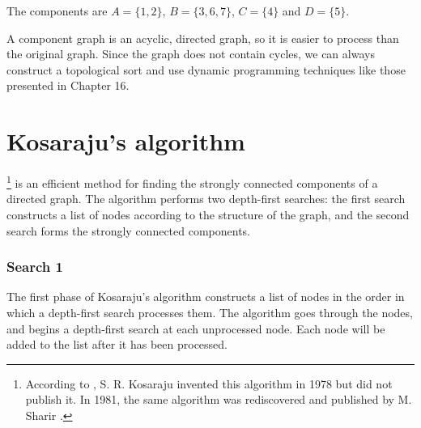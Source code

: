 \begin{center}
\end{center}
The components are $A=\{1,2\}$,
$B=\{3,6,7\}$, $C=\{4\}$ and $D=\{5\}$.

A component graph is an acyclic, directed graph,
so it is easier to process than the original graph.
Since the graph does not contain cycles,
we can always construct a topological sort and
use dynamic programming techniques like those
presented in Chapter 16.

\section{Kosaraju's algorithm}



\footnote{According to \cite{aho83},
    S. R. Kosaraju invented this algorithm in 1978
    but did not publish it. In 1981, the same algorithm was rediscovered
    and published by M. Sharir \cite{sha81}.} is an efficient
method for finding the strongly connected components
of a directed graph.
The algorithm performs two depth-first searches:
the first search constructs a list of nodes
according to the structure of the graph,
and the second search forms the strongly connected components.

\subsubsection{Search 1}

The first phase of Kosaraju's algorithm constructs
a list of nodes in the order in which a
depth-first search processes them.
The algorithm goes through the nodes,
and begins a depth-first search at each
unprocessed node.
Each node will be added to the list
after it has been processed.

